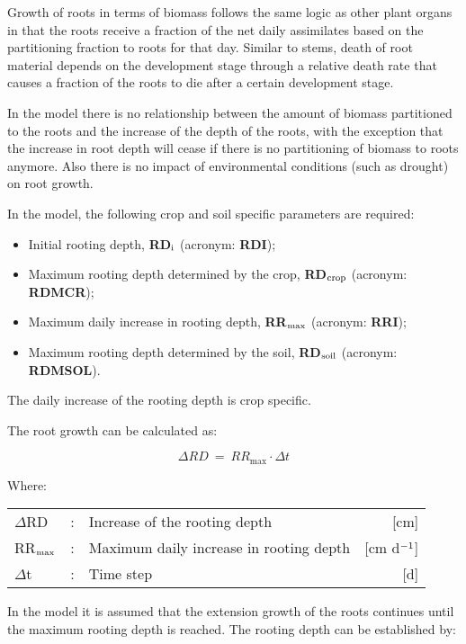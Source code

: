 Growth of roots in terms of biomass follows the same logic as other plant organs in that
the roots receive a fraction of the net daily assimilates based on the partitioning 
fraction to roots for that day. Similar to stems, death of root material depends on 
the development stage through a relative death rate that causes a fraction of the 
roots to die after a certain development stage.

In the model there is no relationship between the amount of biomass partitioned to the roots 
and the increase of the depth of the roots, with the exception that the increase in root
depth will cease if there is no partitioning of biomass to roots anymore. Also there is 
no impact of environmental conditions (such as drought) on root growth.

In the model, the following crop and soil specific parameters are required:
\begin{itemize}
	\item Initial rooting depth, {\bf RD$_{{\rm i}}$} (acronym: {\bf RDI});
	\item Maximum rooting depth determined by the crop, {\bf RD$_{{\rm crop}}$} (acronym: {\bf RDMCR});
	\item Maximum daily increase in rooting depth, {\bf RR$_{{\rm max}}$} (acronym: {\bf RRI});
	\item Maximum rooting depth determined by the soil, {\bf RD$_{{\rm soil}}$} (acronym: {\bf RDMSOL}).
\end{itemize}

The daily increase of the rooting depth is crop specific. 

The root growth can be calculated as:

\begin{equation}
\Delta RD~=~RR_{\max} \cdot \Delta t
\end{equation}

Where:\\[5pt]
\begin{tabularx}{\textwidth}{llXr}
	$\Delta$RD &:& Increase of the rooting depth   &   [cm]\\
	RR$_{{\rm max}}$ &:& Maximum daily increase in rooting depth  &  [cm d$^{{\rm -}{1}}$]\\
	$\Delta$t &:& Time step   &  [d]\\
\end{tabularx}

In the model it is assumed that the extension growth of the roots continues until the
maximum rooting depth is reached. The rooting depth can be established by:

